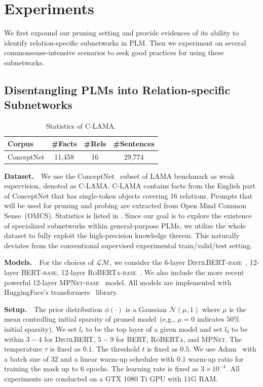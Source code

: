 \section{Experiments}
We first expound our pruning setting
and provide evidences of its ability to identify relation-specific subnetworks in PLM.
Then we experiment on several commonsense-intensive scenarios to seek 
good practices for using these subnetworks.

\subsection{Disentangling PLMs into Relation-specific Subnetworks}
\label{sec:LAMA}
\begin{table}[ht!]
	\centering
	\small
	\begin{tabular}{l|ccc}
		\toprule
		\textbf{Corpus} & \textbf{\#Facts} & \textbf{\#Rels} & \textbf{\#Sentences} \\
		\midrule
		ConceptNet & 11,458 & 16 & 29,774 \\
		\bottomrule
	\end{tabular}
	\caption{Statistics of C-LAMA.}
	\label{table:conceptnet}
\end{table}

\noindent
\textbf{Dataset.}~~We use the ConceptNet~\citep{speer-havasi-2012-representing} subset of LAMA benchmark as weak supervision, denoted as C-LAMA.
C-LAMA contains facts from the English part of ConceptNet that has
single-token objects covering 16 relations. Prompts that will be used 
for pruning and probing are extracted from Open Mind Common Sense~(OMCS). 
Statistics is listed in . Since our goal is 
to explore the existence of specialized subnetworks within general-purpose PLMs, 
we utilize the whole dataset to fully exploit the high-precision knowledge 
therein. This naturally deviates from the conventional supervised 
experimental train/valid/test setting.


\noindent
\textbf{Models.}~~For the choices of $\mathcal{LM}$, we consider the 6-layer \textsc{DistilBERT-base}~\citep{DBLP:journals/corr/abs-1910-01108}, 12-layer \textsc{BERT-base}, 12-layer \textsc{RoBERTa-base}~\citep{DBLP:journals/corr/abs-1907-11692}. We also include the more recent powerful 12-layer \textsc{MPNet-base}~\citep{song2020mpnet} model. All models are implemented with HuggingFace's transformers~\citep{DBLP:journals/corr/abs-1910-03771} library.

\textbf{Setup.}~~The prior distribution $\phi(\cdot)$ is a Gaussian $\mathcal{N}(\mu, 1)$ where $\mu$ is the mean controlling initial sparsity of pruned model~(e.g., $\mu=0$ indicates $50\%$ initial sparsity). We set $l_t$ to be the top layer of a given model and set $l_b$ to be within $3-4$ for \textsc{DistilBERT}, $5-9$ for \textsc{BERT}, \textsc{RoBERTa}, and \textsc{MPNet}. The temperature $\tau$ is fixed as $0.1$. The threshold $t$ is fixed as $0.5$. We use Adam~\citep{kingma2014method} with a batch size of $32$ and a linear warm-up scheduler with $0.1$ warm-up ratio for training the mask up to $6$ epochs. The learning rate is fixed as $3\times 10^{-4}$. All experiments are conducted on a GTX 1080 Ti GPU with 11G RAM.




